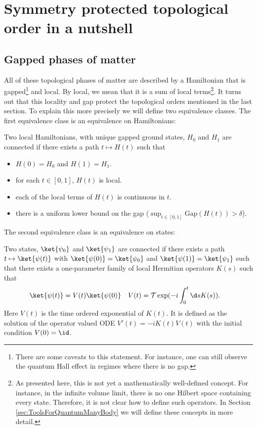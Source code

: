 \chapter{Symmetry protected topological order in a nutshell}\label{sec:SPT_Order_In_A_Nutshell}
\section{Gapped phases of matter}\label{sec:GappedPhasesOfMatterIntro}
All of these topological phases of matter are described by a Hamiltonian that is gapped\footnote{There are some caveats to this statement. For instance, one can still observe the quantum Hall effect in regimes where there is no gap.} and local. By local, we mean that it is a sum of local terms\footnote{As presented here, this is not yet a mathematically well-defined concept. For instance, in the infinite volume limit, there is no one Hilbert space containing every state. Therefore, it is not clear how to define such operators. In Section \ref{sec:ToolsForQuantumManyBody} we will define these concepts in more detail.}. It turns out that this locality and gap protect the topological orders mentioned in the last section. To explain this more precisely we will define two equivalence classes. The first equivalence class is an equivalence on Hamiltonians:
\begin{definition}\label{def:ConnectedHamiltonians}
	Two local Hamiltonians, with unique gapped ground states, $H_0$ and $H_1$ are connected if there exists a path $t\mapsto H(t)$ such that
	\begin{itemize}
		\item $H(0)=H_0$ and $H(1)=H_1$.
		\item for each $t\in[0,1]$, $H(t)$ is local.
		\item each of the local terms of $H(t)$ is continuous in $t$.
		\item there is a uniform lower bound on the gap ($\sup_{t\in[0,1]}\textrm{Gap}(H(t))>\delta$).
	\end{itemize}
\end{definition}
The second equivalence class is an equivalence on states:
\begin{definition}\label{def:ConnectedStates}
	Two states, $\ket{\psi_0}$ and $\ket{\psi_1}$ are connected if there exists a path $t\mapsto \ket{\psi(t)}$ with $\ket{\psi(0)}=\ket{\psi_0}$ and $\ket{\psi(1)}=\ket{\psi_1}$ such that there exists a one-parameter family of local Hermitian operators $K(s)$ such that
	\begin{align}
	\ket{\psi(t)}&=V(t)\ket{\psi(0)}&V(t)&=\mathcal{T}\exp(-i\int_{0}^{t}\d s K(s)).
	\end{align}
	Here $V(t)$ is the time ordered exponential of $K(t)$. It is defined as the solution of the operator valued ODE $V'(t)=-iK(t)V(t)$ with the initial condition $V(0)=\id$.
\end{definition}
